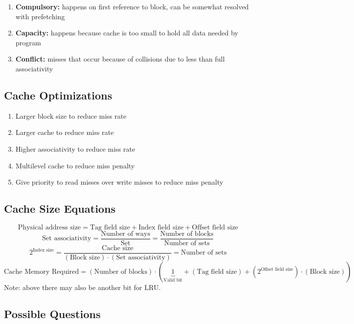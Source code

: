 \documentclass{article}
\begin{document}
\begin{enumerate}
\item \textbf{Compulsory:} happens on first reference to block, can be somewhat resolved with prefetching
\item \textbf{Capacity:} happens because cache is too small to hold all data needed by program
\item \textbf{Conflict:} misses that occur because of collisions due to less than full associativity
\end{enumerate}

\subsection{Cache Optimizations}

\begin{enumerate}
\item Larger block size to reduce miss rate
\item Larger cache to reduce miss rate
\item Higher associativity to reduce miss rate
\item Multilevel cache to reduce miss penalty
\item Give priority to read misses over write misses to reduce miss penalty
\end{enumerate}

\subsection{Cache Size Equations}
$$ \text{Physical address size} = \text{Tag field size} + \text{Index field size} + \text{Offset field size} $$
$$ \text{Set associativity} = \frac{\text{Number of ways}}{\text{Set}} = \frac{\text{Number of blocks}}{\text{Number of sets}} $$
$$ 2^{\text{Index size}} = \frac{\text{Cache size}}{(\text{Block size}) \cdot (\text{Set associativity})} = \text{Number of sets} $$
$$ \text{Cache Memory Required} = (\text{Number of blocks}) \cdot \left( \underbrace{1}_\text{Valid bit} + (\text{Tag field size}) + (2^\text{Offset field size}) \cdot ( \text{Block size} ) \right) $$
Note: above there may also be another bit for LRU.

\subsection{Possible Questions}
\end{document}
